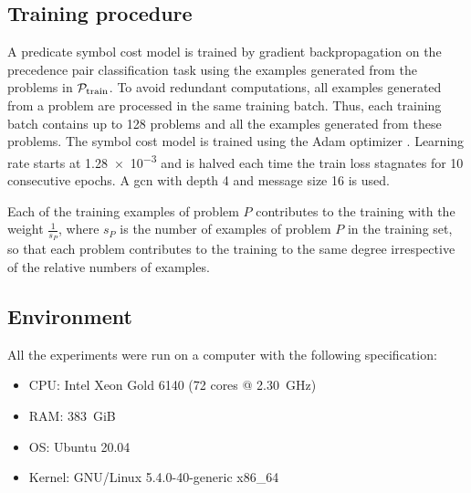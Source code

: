 \subsection{Training procedure}

A predicate symbol cost model is trained by gradient backpropagation
on the precedence pair classification task
using the examples generated from the problems in $\operatorname{\mathcal{P}_{\mathrm{train}}}$.
To avoid redundant computations, all examples generated from a problem are processed in the same training batch.
Thus, each training batch contains up to \num{128} problems and all the examples generated from these problems.
The symbol cost model is trained using the Adam optimizer \cite{Kingma2014}.
Learning rate starts at \num{1.28e-3}
and is halved each time the train loss stagnates for 10 consecutive epochs.
A \gls{gcn} with depth 4 and message size 16 is used.

Each of the training examples of problem $P$ contributes to the training with the weight $\frac{1}{s_P}$,
where $s_P$ is the number of examples of problem $P$ in the training set,
so that each problem contributes to the training to the same degree irrespective of the relative numbers of examples.

\subsection{Environment}

All the experiments were run on a computer with the following specification:

\begin{itemize}
\item CPU: Intel Xeon Gold 6140 (72 cores @ \SI{2.30}{GHz})
\item RAM: \SI{383}{GiB}
\item OS: Ubuntu 20.04
\item Kernel: GNU/Linux 5.4.0-40-generic x86\_64
\end{itemize}

